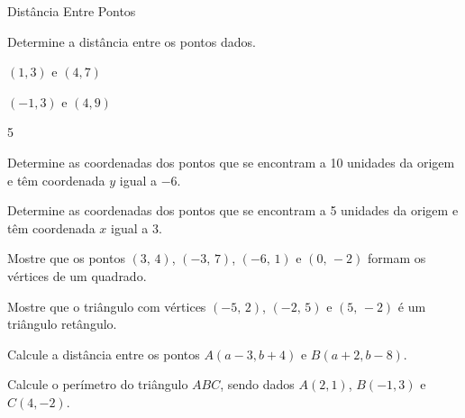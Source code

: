 \begin{exercicios}{Distância Entre Pontos}
    \begin{exercicio}
        Determine a distância entre os pontos dados.
        \begin{alphalist}[2]
            \item $(1, 3)$ e $(4,7)$
            \item $(-1,3)$ e $(4,9)$
        \end{alphalist}	
        \begin{answers}
            \begin{mathlist}[2]
                \item 5
                \item {}
            \end{mathlist}
        \end{answers}
    \end{exercicio}
    
    \begin{exercicio}
        Determine as coordenadas dos pontos  que se encontram a 10 unidades da origem e têm coordenada $y$ igual a $-6$.
    \end{exercicio}
    
    \begin{exercicio}
        Determine as coordenadas dos pontos  que se encontram a 5 unidades da origem e têm coordenada $x$ igual a $3$.
    \end{exercicio}
    
    \begin{exercicio}
        Mostre que os pontos $(3, \, 4)$, $(-3, \, 7)$, $(-6, \, 1)$ e $(0, \, -2)$ formam os vértices de um quadrado.
    \end{exercicio}
    
    \begin{exercicio}
        Mostre que o triângulo com vértices $(-5, \, 2)$, $(-2, \, 5)$ e $(5, \, -2)$ é um triângulo retângulo.
    \end{exercicio}
        
    \begin{exercicio}
        Calcule a distância entre os pontos $A(a-3,b+4)$ e $B(a+2,b-8)$.
    \end{exercicio}
    
    \begin{exercicio}
        Calcule o perímetro do triângulo $ABC$, sendo dados $A(2,1)$, $B(-1,3)$ e $C(4,-2)$.
    \end{exercicio}
    

\end{exercicios}
